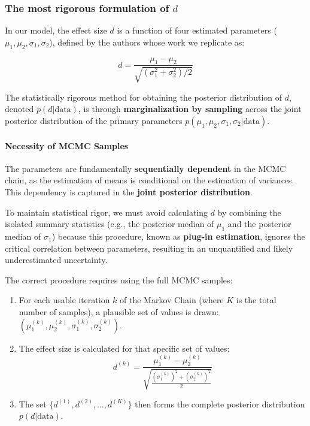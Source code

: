 \documentclass[preview]{article}
\begin{document}
\subsubsection{The most rigorous formulation of $d$}

In our model, the effect size $d$ is a function of four estimated parameters ($\mu_1, \mu_2, \sigma_1, \sigma_2$), defined by the authors whose work we replicate as:

\begin{equation}
d = \frac{\mu_1 - \mu_2}{\sqrt{(\sigma_1^2 + \sigma_2^2)/2}}
\end{equation}

The statistically rigorous method for obtaining the posterior distribution of $d$, denoted $p(d | \text{data})$, is through \textbf{marginalization by sampling} across the joint posterior distribution of the primary parameters $p(\mu_1, \mu_2, \sigma_1, \sigma_2 | \text{data})$.

\paragraph{Necessity of MCMC Samples}

The parameters are fundamentally \textbf{sequentially dependent} in the MCMC chain, as the estimation of means is conditional on the estimation of variances. This dependency is captured in the \textbf{joint posterior distribution}.

To maintain statistical rigor, we must avoid calculating $d$ by combining the isolated summary statistics (e.g., the posterior median of $\mu_1$ and the posterior median of $\sigma_1$) because this procedure, known as \textbf{plug-in estimation}, ignores the critical correlation between parameters, resulting in an unquantified and likely underestimated uncertainty.

The correct procedure requires using the full MCMC samples:

\begin{enumerate}
    \item For each usable iteration $k$ of the Markov Chain (where $K$ is the total number of samples), a plausible set of values is drawn: $(\mu_1^{(k)}, \mu_2^{(k)}, \sigma_1^{(k)}, \sigma_2^{(k)})$.
    \item The effect size is calculated for that specific set of values:
    $$d^{(k)} = \frac{\mu_1^{(k)} - \mu_2^{(k)}}{\sqrt{\frac{(\sigma_1^{(k)})^2 + (\sigma_2^{(k)})^2}{2}}}$$
    \item The set $\{d^{(1)}, d^{(2)}, \ldots, d^{(K)}\}$ then forms the complete posterior distribution $p(d | \text{data})$.
\end{enumerate}
\end{document}
